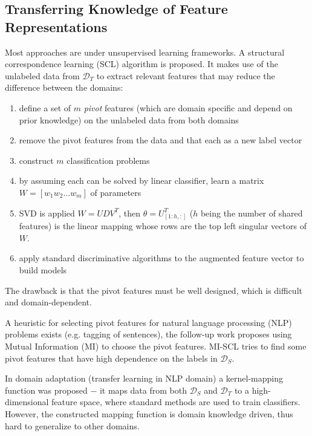 \documentclass[a4paper,twocolumn]{article}
\newcommand{\D}{\mathcal{D}}
\begin{document}
\subsection{Transferring Knowledge of Feature Representations}
Most approaches are under unsupervised learning frameworks. A structural correspondence learning (SCL) algorithm is proposed. It makes use of the unlabeled data from $\D_T$ to extract relevant features that may reduce the difference between the domains:
\begin{enumerate}
    \item define a set of $m$ \textit{pivot} features (which are domain specific and depend on prior knowledge) on the unlabeled data from both domains
    \item remove the pivot features from the data and that each as a new label vector
    \item construct $m$ classification problems
    \item by assuming each can be solved by linear classifier, learn a matrix $W = [w_1 w_2 \ldots w_m]$ of parameters
    \item SVD is applied $W = UDV^T$, then $\theta = U_{[1:h,:]}^T$ ($h$ being the number of shared features) is the linear mapping whose rows are the top left singular vectors of $W$.
    \item apply standard discriminative algorithms to the augmented feature vector to build models
\end{enumerate}
The drawback is that the pivot features must be well designed, which is difficult and domain-dependent.

A heuristic for selecting pivot features for natural language processing (NLP) problems exists (e.g. tagging of sentences), the follow-up work proposes using Mutual Information (MI) to choose the pivot features. MI-SCL tries to find some pivot features that have high dependence on the labels in $\D_S$.

In domain adaptation (transfer learning in NLP domain) a kernel-mapping function was proposed $-$ it maps data from both $\D_S$ and $\D_T$ to a high-dimensional feature space, where standard methods are used to train classifiers. However, the constructed mapping function is domain knowledge driven, thus hard to generalize to other domains.
\end{document}
